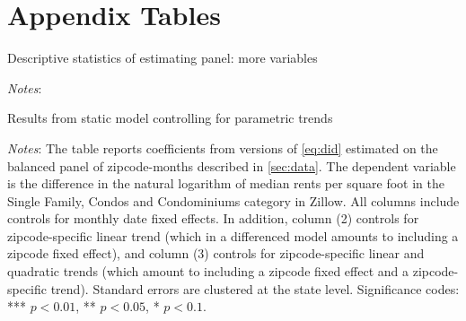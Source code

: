 
\section{Appendix Tables}

\begin{table}[h!]
	\caption{Descriptive statistics of estimating panel: more variables}
	\label{tab:did_trend}
	\centering
	
	\begin{minipage}{0.95\textwidth} \footnotesize
		\vspace{3mm} 
		\textit{Notes}: 
	\end{minipage}
\end{table}

\begin{table}[h!]
	\caption{Results from static model controlling for parametric trends}
	\label{tab:did_trend}
	\centering
	
	\begin{minipage}{0.95\textwidth} \footnotesize
		\vspace{3mm} 
		\textit{Notes}: The table reports coefficients from versions of \autoref{eq:did} 
		estimated on the balanced panel of zipcode-months described in \autoref{sec:data}. 
		The dependent variable is the difference in the natural logarithm of median	rents 
		per	square foot in the Single Family, Condos and Condominiums category in Zillow. 
		All columns include	controls for monthly date fixed effects. In addition, column 
		(2) controls for zipcode-specific linear trend (which in a differenced model 
		amounts to including a zipcode fixed effect), and column (3) controls for 
		zipcode-specific linear and	quadratic trends (which amount to including a zipcode 
		fixed effect and a zipcode-specific trend). Standard errors are clustered at 
		the state level. Significance codes: *** $p < 0.01$, ** $p < 0.05$, * $p < 0.1$.
	\end{minipage}
\end{table}

